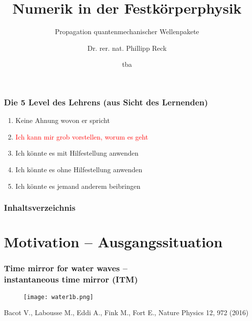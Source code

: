 \documentclass{beamer}
\begin{document}
\title{Numerik in der Festkörperphysik}
\subtitle{Propagation quantenmechanischer Wellenpakete}
\author[Phillipp Reck]{Dr. rer. nat. Phillipp Reck}
\date{tba} 

\begin{frame}
\titlepage\end{frame}

\begin{frame}\frametitle{Die 5 Level des Lehrens (aus Sicht des Lernenden)}
    
\begin{enumerate}
  \item  \glqq Keine Ahnung wovon er spricht\grqq
  \item  \textcolor<2->{red}{\glqq Ich kann mir grob vorstellen, worum es geht\grqq}
  \item  \glqq Ich könnte es mit Hilfestellung anwenden\grqq
  \item  \glqq Ich könnte es ohne Hilfestellung anwenden\grqq
  \item  \glqq Ich könnte es jemand anderem beibringen\grqq
\end{enumerate}

\vfill

\end{frame} 
    

\begin{frame}
\frametitle{Inhaltsverzeichnis}\tableofcontents
\end{frame} 


\section{Motivation -- Ausgangssituation}



\begin{frame}%
  \frametitle{Time mirror for water waves -- \\instantaneous time mirror (ITM)}
      \begin{figure}\centering
       \texttt{[image: water1b.png]}
      \end{figure}
  \vspace{\fill}
  {\footnotesize \alert{Bacot V., Labousse M., Eddi A., Fink M., Fort E.}, Nature Physics 12, 972 (2016)}
  \end{frame}
  
\end{document}
